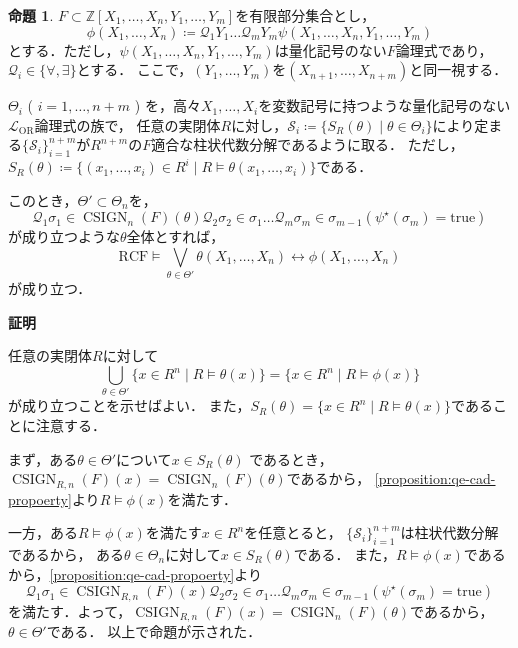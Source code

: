 \documentclass[uplatex, dvipdfmx]{jsarticle}
\makeatletter
\numberwithin{equation}{section}
\renewenvironment{proof}[1][\proofname]{\par
  \pushQED{\qed}%
  \normalfont \topsep6\p@\@plus6\p@\relax
  \trivlist
  \item\relax
  {\bfseries
  #1\@addpunct{.}}\hspace\labelsep\ignorespaces
}{
  \popQED\endtrivlist\@endpefalse
}
\newcommand{\Z}{\mathbb{Z}}
\newcommand{\Qua}{\mathcal{Q}}
\newcommand{\RCF}{\mathrm{RCF}}
\newcommand{\true}{\text{true}}
\DeclareMathOperator{\CSIGN}{CSIGN}
\theoremstyle{definition}
\newtheorem{proposition}[definition]{命題}
\renewcommand{\proofname}{\textbf{証明}}
\makeatother
\begin{document}
\begin{proposition} \label{proposition:qe-cad-method}
     $F \subset \Z[X_1, \dots, X_n, Y_1, \dots, Y_m]$を有限部分集合とし，
     \begin{equation}
          \phi(X_1, \dots, X_n) \coloneqq \Qua_1 Y_1 \dots \Qua_m Y_m \psi(X_1, \dots, X_n, Y_1, \dots, Y_m)
     \end{equation}
     とする．ただし，$\psi(X_1, \dots, X_n, Y_1, \dots, Y_m)$は量化記号のない$F$論理式であり，$\Qua_i \in \{\forall, \exists\}$とする．
     ここで，$(Y_1, \dots, Y_m)$を$(X_{n+1}, \dots, X_{n+m})$と同一視する．
     
     $\Theta_i$  ( $i=1, \dots, n+m$ ) を，高々$X_1, \dots, X_i$を変数記号に持つような量化記号のない$\mathcal{L}_{\mathrm{OR}}$論理式の族で，
     任意の実閉体$R$に対し，$\mathcal{S}_i \coloneqq \{S_R(\theta)\mid \theta \in \Theta_i\}$により定まる$\{\mathcal{S}_i\}_{i=1}^{n+m}$が$R^{n+m}$の$F$適合な柱状代数分解であるように取る．
     ただし，$S_R(\theta) \coloneqq \{(x_1, \dots, x_i) \in R^i \mid R \models \theta(x_1, \dots, x_i)\}$である．
     
     このとき，$\Theta' \subset \Theta_n$を，
     \begin{equation}
          \Qua_1 \sigma_1 \in \CSIGN_n(F)(\theta) \Qua_2 \sigma_2 \in \sigma_1 \dots \Qua_m \sigma_m \in \sigma_{m-1}(\psi^\star(\sigma_m) = \true)
     \end{equation}
     が成り立つような$\theta$全体とすれば，
     \begin{equation}
          \RCF \models \bigvee_{\theta \in \Theta'} \theta(X_1, \dots, X_n) \leftrightarrow \phi(X_1, \dots, X_n)
     \end{equation}
     が成り立つ．
\end{proposition}

\begin{proof}
     任意の実閉体$R$に対して
     \begin{equation}
          \bigcup_{\theta \in \Theta'} \{x \in R^n \mid R \models \theta(x)\} = \{x \in R^n \mid R \models \phi(x)\}
     \end{equation}
     が成り立つことを示せばよい．
     また，$S_R(\theta) = \{x \in R^n \mid R \models \theta(x)\}$であることに注意する．

     まず，ある$\theta \in \Theta'$について$x \in S_R(\theta)$
     であるとき，$\CSIGN_{R,n}(F)(x) = \CSIGN_n(F)(\theta)$であるから，
     \cref{proposition:qe-cad-propoerty}より$R \models \phi(x)$を満たす．

     一方，ある$R \models \phi(x)$を満たす$x \in R^n$を任意とると，
     $\{\mathcal{S}_i\}_{i=1}^{n+m}$は柱状代数分解であるから，
     ある$\theta \in \Theta_n$に対して$x \in S_R(\theta)$である．
     また，$R \models \phi(x)$であるから，\cref{proposition:qe-cad-propoerty}より
     \begin{equation}
          \Qua_1 \sigma_1 \in \CSIGN_{R,n}(F)(x) \Qua_2 \sigma_2 \in \sigma_1 \dots \Qua_m \sigma_m \in \sigma_{m-1} (\psi^\star(\sigma_m) = \true)
     \end{equation}
     を満たす．よって，$\CSIGN_{R,n}(F)(x) = \CSIGN_n(F)(\theta)$であるから，
     $\theta \in \Theta'$である．
     以上で命題が示された．
\end{proof}
\end{document}
